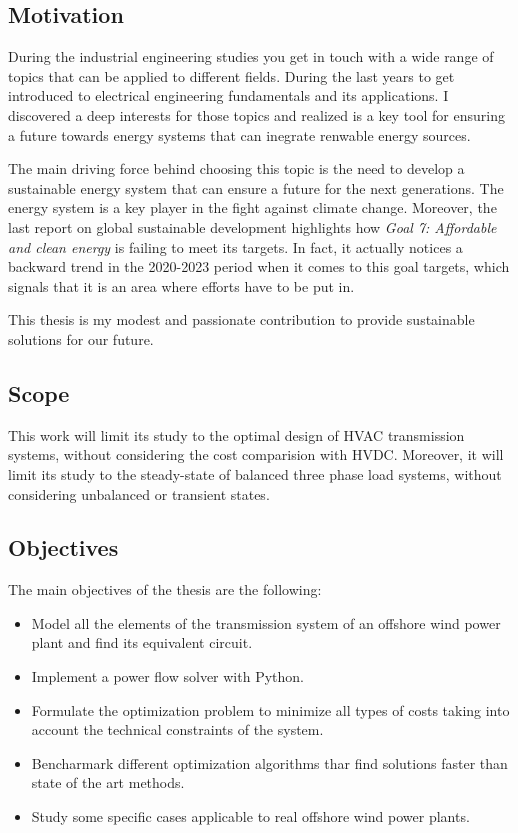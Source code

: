 \documentclass[a4paper,11pt, titlepage, twoside]{article}
\begin{document}
\subsection{Motivation}

During the industrial engineering studies you get in touch with a wide range of topics that can be applied
to different fields. During the last years to get introduced to electrical engineering fundamentals and its 
applications. I discovered a deep interests for those topics and realized is a key tool for ensuring a future towards
energy systems that can inegrate renwable energy sources.\par

The main driving force behind choosing this topic is the need to develop a sustainable energy system that can
ensure a future for the next generations. The energy system is a key player in the fight against climate change. Moreover, the last
report on global sustainable development \cite{SustGoal7} highlights how \textit{Goal 7: Affordable and clean energy} is failing to meet its targets.
In fact, it actually notices a backward trend in the 2020-2023 period when it comes to this goal targets, which signals that it is an area where efforts
have to be put in. \par

This thesis is my modest and passionate contribution to provide sustainable solutions for our future.

\subsection{Scope}

This work will limit its study to the optimal design of HVAC transmission systems, without considering the cost comparision with
HVDC.  Moreover, it will limit its study to the steady-state of balanced three phase load systems, without considering unbalanced or transient states.
\subsection{Objectives}

The main objectives of the thesis are the following:
\begin{itemize}
    \item Model all the elements of the transmission system of an offshore wind power plant and find its equivalent circuit.
    \item Implement a power flow solver with Python.
    \item Formulate the optimization problem to minimize all types of costs taking into account the technical constraints of the system. 
    \item Bencharmark different optimization algorithms thar find solutions faster than state of the art methods.
    \item Study some specific cases applicable to real offshore wind power plants.
  \end{itemize}
\end{document}

